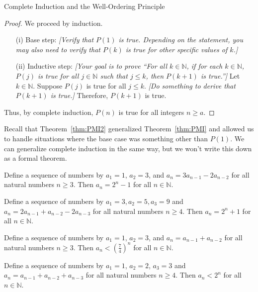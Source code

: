 \begin{section}{Complete Induction and the Well-Ordering Principle}
\begin{skeleton}
\begin{mdframed}[style=skeleton]
\begin{proof}
We proceed by induction.
\begin{enumerate}\setlength{\itemsep}{0in}
\item[(i)] Base step: \emph{[Verify that $P(1)$ is true.  Depending on the statement, you may also need to verify that $P(k)$ is true for other specific values of $k$.]}

\item[(ii)] Inductive step:  \emph{[Your goal is to prove ``For all $k\in\mathbb{N}$, if for each $k \in \mathbb{N}$, $P(j)$ is true for all $j\in \mathbb{N}$ such that $j \leq k$, then $P(k+1)$ is true.'']} Let $k \in \mathbb{N}$.  Suppose $P(j)$ is true for all $j \leq k$. \emph{[Do something to derive that $P(k+1)$ is true.]} Therefore, $P(k+1)$ is true.
\end{enumerate}
Thus, by complete induction, $P(n)$ is true for all integers $n \ge a$.
\end{proof}
\end{mdframed}
\end{skeleton}

Recall that Theorem~\ref{thm:PMI2} generalized Theorem~\ref{thm:PMI} and allowed us to handle situations where the base case was something other than $P(1)$.  We can generalize complete induction in the same way, but we won't write this down as a formal theorem.

\begin{theorem}
Define a sequence of numbers by $a_1 = 1$, $a_2 = 3$, and $a_n = 3a_{n-1} - 2a_{n-2}$ for all natural numbers $n \geq 3$.  Then $a_n = 2^n - 1$ for all $n \in \mathbb{N}$.  
\end{theorem}

\begin{theorem}
Define a sequence of numbers by $a_1 = 3, a_2 = 5, a_3 = 9$ and $a_n = 2a_{n-1} + a_{n-2}-2a_{n-3}$ for all natural numbers $n \geq 4$.  Then $a_n = 2^n + 1$ for all $n \in \mathbb{N}$.  
\end{theorem}

\begin{theorem}
Define a sequence of numbers by $a_1=1$, $a_2=3$, and $a_n=a_{n-1}+a_{n-2}$ for all natural numbers $n \geq 3$.  Then $a_n < \left( \frac{7}{4} \right)^n$ for all $n \in \mathbb{N}$.
\end{theorem}

\begin{theorem}
Define a sequence of numbers by $a_1=1$, $a_2=2$, $a_3=3$ and $a_n=a_{n-1}+a_{n-2}+a_{n-3}$ for all natural numbers $n\geq 4$.  Then $a_n<2^n$ for all $n\in\mathbb N$.
\end{theorem}


\end{section}

